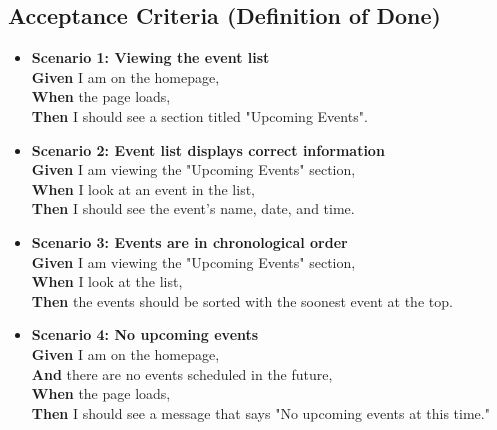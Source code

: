 \documentclass[11pt, a4paper]{article}
\begin{document}
\subsection*{Acceptance Criteria (Definition of Done)}
\begin{itemize}
    \item \textbf{Scenario 1: Viewing the event list} \\
    \textbf{Given} I am on the homepage, \\
    \textbf{When} the page loads, \\
    \textbf{Then} I should see a section titled "Upcoming Events".

    \item \textbf{Scenario 2: Event list displays correct information} \\
    \textbf{Given} I am viewing the "Upcoming Events" section, \\
    \textbf{When} I look at an event in the list, \\
    \textbf{Then} I should see the event's name, date, and time.

    \item \textbf{Scenario 3: Events are in chronological order} \\
    \textbf{Given} I am viewing the "Upcoming Events" section, \\
    \textbf{When} I look at the list, \\
    \textbf{Then} the events should be sorted with the soonest event at the top.

    \item \textbf{Scenario 4: No upcoming events} \\
    \textbf{Given} I am on the homepage, \\
    \textbf{And} there are no events scheduled in the future, \\
    \textbf{When} the page loads, \\
    \textbf{Then} I should see a message that says "No upcoming events at this time."
\end{itemize}

\end{document}
